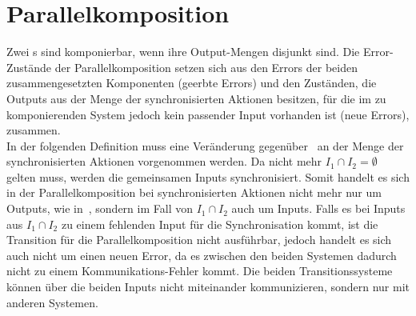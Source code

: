 \section{Parallelkomposition}
Zwei \EIO{}s sind komponierbar, wenn ihre Output-Mengen disjunkt sind. Die
Error-Zustän\-de der Parallelkomposition setzen sich aus den Errors der
beiden zusammengesetzten Komponenten (geerbte Errors) und den Zuständen, die
Outputs aus der Menge der synchronisierten Aktionen besitzen, für die im zu
komponierenden System jedoch kein passender Input vorhanden ist (neue Errors),
zusammen.\\
In der folgenden Definition muss eine Veränderung
gegenüber~\cite{Vogler2014EIO} an der Menge der synchronisierten
Aktionen vorgenommen werden. Da nicht mehr $I_1\cap I_2 =\emptyset$ gelten
muss, werden die gemeinsamen Inputs synchronisiert. Somit handelt es sich in
der Parallelkomposition bei synchronisierten Aktionen nicht mehr nur um
Outputs, wie in~\cite{Vogler2014EIO}, sondern im Fall von $I_1\cap I_2$ auch um
Inputs. Falls es bei Inputs aus $I_1\cap I_2$ zu einem fehlenden Input für die
Synchronisation kommt, ist die Transition für die Parallelkomposition nicht
ausführbar, jedoch handelt es sich auch nicht um einen neuen Error, da es
zwischen den beiden Systemen dadurch nicht zu einem Kommunikations-Fehler
kommt. Die beiden Transitionssysteme können über die beiden Inputs nicht
miteinander kommunizieren, sondern nur mit anderen Systemen.

